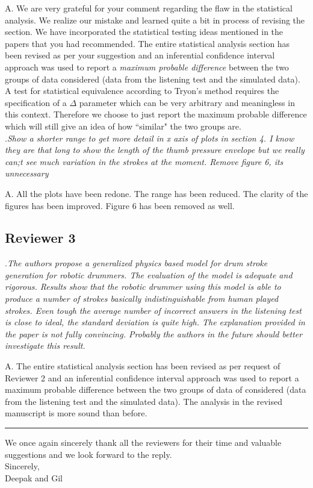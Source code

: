 \documentclass[]{article}
\begin{document}
\noindent A. We are very grateful for your comment regarding the flaw in the statistical analysis. We realize our mistake and learned quite a bit in process of revising the section. We have incorporated the statistical testing ideas mentioned in the papers that you had recommended. The entire statistical analysis section has been revised as per your suggestion and an inferential confidence interval approach was used to report a \textit{maximum probable difference} between the two groups of data considered (data from the listening test and the simulated data). A test for statistical equivalence according to Tryon's method requires the specification of a $\Delta$ parameter which can be very arbitrary and meaningless in this context. Therefore we choose to just report the maximum probable difference which will still give an idea of how ``similar" the two groups are. \\

.\textit{Show a shorter range to get more detail in x axis of plots in section 4. I know they are that long to show the length of the thumb pressure envelope but we really can;t see much variation in the strokes at the moment. Remove figure 6, its unnecessary}

\noindent A. All the plots have been redone. The range has been reduced. The clarity of the figures has been improved. Figure 6 has been removed as well. 

\subsection*{Reviewer 3}

.\textit{The authors propose a generalized physics based model for drum stroke generation for robotic drummers. The evaluation of the model is adequate and rigorous. Results show that the robotic drummer using this model is able to produce a number of strokes basically indistinguishable from human played strokes.
	Even tough the average number of incorrect answers in the listening test is close to ideal, the standard deviation is quite high. The explanation provided in the paper is not fully convincing. Probably the authors in the future should better investigate this result. }

\noindent A. The entire statistical analysis section has been revised as per request of Reviewer 2 and an inferential confidence interval approach was used to report a maximum probable difference between the two groups of data of considered (data from the listening test and the simulated data). The analysis in the revised manuscript is more sound than before.

\noindent\rule{\textwidth}{1pt}

\noindent We once again sincerely thank all the reviewers for their time and valuable suggestions and we look forward to the reply.
\\
Sincerely,\\
Deepak and Gil
  
\end{document}
